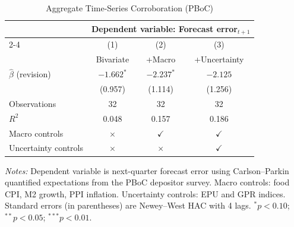 \begin{table}[htbp]
\centering
\begin{threeparttable}
\caption{Aggregate Time-Series Corroboration (PBoC)}
\label{tab:ols_baseline}
{\small
\begin{tabular}{lccc}
\toprule
 & \multicolumn{3}{c}{Dependent variable: Forecast error$_{t+1}$} \\
\cmidrule(lr){2-4}
 & (1) & (2) & (3) \\
 & Bivariate & +Macro & +Uncertainty \\
\midrule
$\hat{\beta}$ (revision) & $-1.662^{*}$ & $-2.237^{*}$ & $-2.125$ \\
 & (0.957) & (1.114) & (1.256) \\
\addlinespace
Observations & 32 & 32 & 32 \\
$R^2$ & 0.048 & 0.157 & 0.186 \\
\addlinespace
Macro controls & $\times$ & $\checkmark$ & $\checkmark$ \\
Uncertainty controls & $\times$ & $\times$ & $\checkmark$ \\
\bottomrule
\end{tabular}
}
\begin{tablenotes}[flushleft]
\footnotesize
\item \textit{Notes:} Dependent variable is next-quarter forecast error using Carlson--Parkin quantified expectations from the PBoC depositor survey. Macro controls: food CPI, M2 growth, PPI inflation. Uncertainty controls: EPU and GPR indices. Standard errors (in parentheses) are Newey--West HAC with 4 lags. $^{*}p<0.10$; $^{**}p<0.05$; $^{***}p<0.01$.
\end{tablenotes}
\end{threeparttable}
\end{table}
